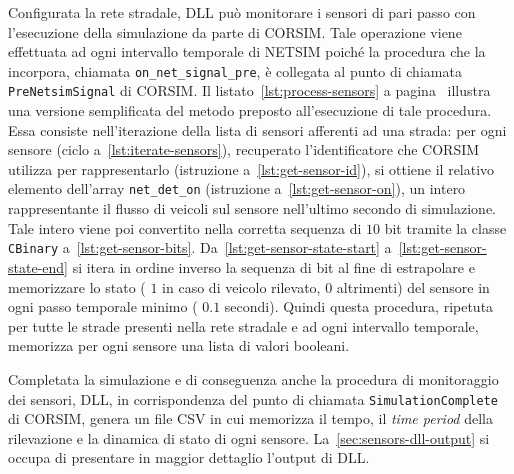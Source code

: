 Configurata la rete stradale,  \acs{DLL} può monitorare i sensori di pari passo con l'esecuzione della simulazione da parte di \acs{CORSIM}. Tale operazione viene effettuata ad ogni intervallo temporale di \acs{NETSIM} poiché la procedura che la incorpora, chiamata \lstinline[]|on_net_signal_pre|, è collegata al punto di chiamata \lstinline[]|PreNetsimSignal| di \acs{CORSIM}. Il listato~\ref{lst:process-sensors} a pagina~\pageref{lst:process-sensors} illustra una versione semplificata del metodo \CC{} preposto all'esecuzione di tale procedura. Essa consiste nell'iterazione della lista di sensori afferenti ad una strada: per ogni sensore (ciclo a~\autoref{lst:iterate-sensors}), recuperato l'identificatore che \acs{CORSIM} utilizza per rappresentarlo (istruzione a~\autoref{lst:get-sensor-id}), si ottiene il relativo elemento dell'array \lstinline[]|net_det_on| (istruzione a~\autoref{lst:get-sensor-on}), un intero rappresentante il flusso di veicoli sul sensore nell'ultimo secondo di simulazione. Tale intero viene poi convertito nella corretta sequenza di $10$ bit tramite la classe \lstinline[]|CBinary| a~\autoref{lst:get-sensor-bits}. Da~\autoref{lst:get-sensor-state-start} a~\autoref{lst:get-sensor-state-end} si itera in ordine inverso la sequenza di bit al fine di estrapolare e memorizzare lo stato (\ie{} $1$ in caso di veicolo rilevato, $0$ altrimenti) del sensore in ogni passo temporale minimo (\ie{} $0.1$ secondi). Quindi questa procedura, ripetuta per tutte le strade presenti nella rete stradale e ad ogni intervallo temporale, memorizza per ogni sensore una lista di valori booleani.

Completata la simulazione e di conseguenza anche la procedura di monitoraggio dei sensori,  \acs{DLL}, in corrispondenza del punto di chiamata \lstinline[]|SimulationComplete| di \acs{CORSIM}, genera un file \acs{CSV} in cui memorizza il tempo, il \emph{time period} della rilevazione e la dinamica di stato di ogni sensore. La~\vref{sec:sensors-dll-output} si occupa di presentare in maggior dettaglio l'output di  \acs{DLL}.

